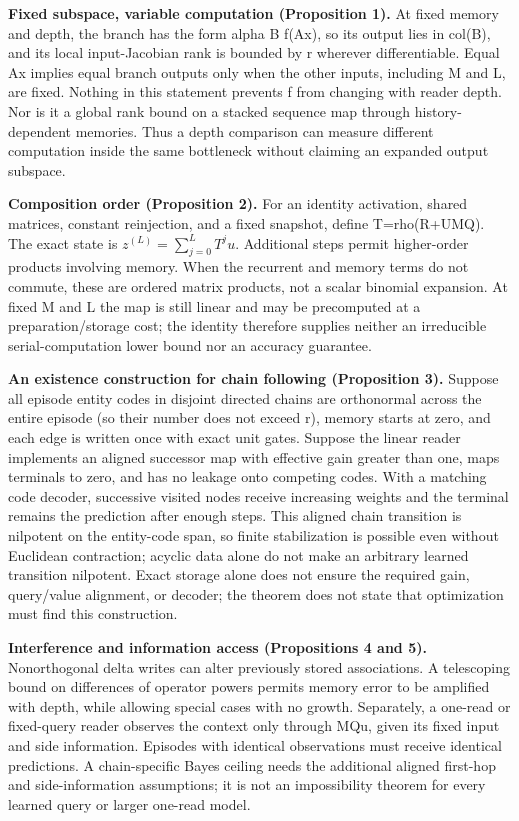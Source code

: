\textbf{Fixed subspace, variable computation (Proposition 1).} At fixed memory and depth,
the branch has the form alpha B f(Ax), so its output lies in col(B), and its local
input-Jacobian rank is bounded by r wherever differentiable. Equal Ax implies equal
branch outputs only when the other inputs, including M and L, are fixed. Nothing in
this statement prevents f from changing with reader depth. Nor is it a global rank
bound on a stacked sequence map through history-dependent memories. Thus a depth
comparison can measure different computation inside the same bottleneck without
claiming an expanded output subspace.

\textbf{Composition order (Proposition 2).} For an identity activation, shared matrices,
constant reinjection, and a fixed snapshot, define T=rho(R+UMQ). The exact state is
\(z^{(L)}=\sum_{j=0}^{L}T^j u\). Additional steps permit higher-order products involving
memory. When the recurrent and memory terms do not commute, these are ordered matrix
products, not a scalar binomial expansion. At fixed M and L the map is still linear
and may be precomputed at a preparation/\allowbreak{}storage cost; the identity therefore supplies
neither an irreducible serial-computation lower bound nor an accuracy guarantee.

\textbf{An existence construction for chain following (Proposition 3).} Suppose all episode
entity codes in disjoint directed chains are orthonormal across the entire episode
(so their number does not exceed r), memory starts at zero, and each edge is written
once with exact unit gates. Suppose the linear reader implements an aligned
successor map with effective gain greater than one, maps terminals to zero, and has
no leakage onto competing codes. With a
matching code decoder, successive visited nodes receive increasing weights and the
terminal remains the prediction after enough steps. This aligned chain transition is
nilpotent on the entity-code span, so finite stabilization is possible even without Euclidean contraction;
acyclic data alone do not make an arbitrary learned transition nilpotent.
Exact storage alone does not ensure the required gain, query/\allowbreak{}value alignment, or decoder;
the theorem does not state that optimization must find this construction.

\textbf{Interference and information access (Propositions 4 and 5).} Nonorthogonal delta
writes can alter previously stored associations. A telescoping bound on differences
of operator powers permits memory error to be amplified with depth, while allowing
special cases with no growth. Separately, a one-read or fixed-query reader observes
the context only through MQu, given its fixed input and side information. Episodes
with identical observations must receive identical predictions. A chain-specific
Bayes ceiling needs the additional aligned first-hop and side-information assumptions;
it is not an impossibility theorem for every learned query or larger one-read model.

